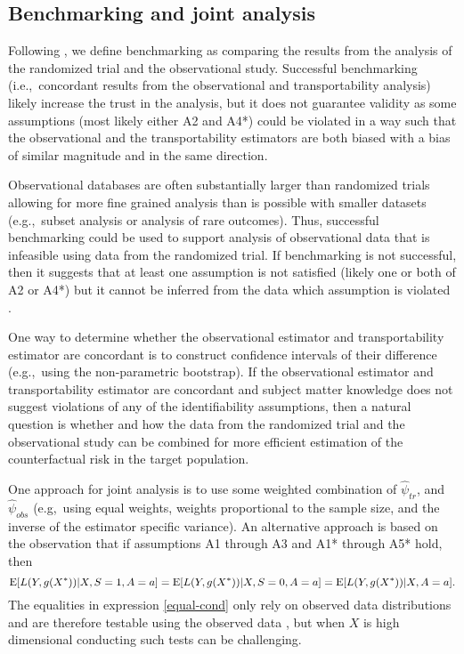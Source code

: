 \documentclass[11pt]{article}
\DeclareMathOperator{\E}{\textnormal{\mbox{E}}}
\begin{document}
\subsection*{Benchmarking and joint analysis}

Following \cite{dahabreh2020benchmarking}, we define benchmarking as comparing the results from the analysis of the randomized trial and the observational study. Successful benchmarking (i.e.,~concordant results from the observational and transportability analysis) likely increase the trust in the analysis, but it does not guarantee validity as some assumptions (most likely either A2 and A4*) could be violated in a way such that the observational and the transportability estimators are both biased with a bias of similar magnitude and in the same direction.

Observational databases are often substantially larger than randomized trials allowing for more fine grained analysis than is possible with smaller datasets (e.g.,~subset analysis or analysis of rare outcomes). Thus, successful benchmarking could be used to support analysis of observational data that is infeasible using data from the randomized trial. If benchmarking is not successful, then it suggests that at least one assumption is not satisfied (likely one or both of A2 or A4*) but it cannot be inferred from the data which assumption is violated \cite{dahabreh_benchmarking_2020}. 

One way to determine whether the observational estimator and transportability estimator are concordant is to construct confidence intervals of their difference (e.g.,~using the non-parametric bootstrap). If the observational estimator and transportability estimator are concordant and subject matter knowledge does not suggest violations of any of the identifiability assumptions, then a natural question is whether and how the data from the randomized trial and the observational study can be combined for more efficient estimation of the counterfactual risk in the target population\cite{dahabreh2020benchmarking,dahabreh2023using, hartman2015sate}. 

One approach for joint analysis is to use some weighted combination of $\widehat\psi_{tr}$, and $\widehat\psi_{obs}$ (e.g,~using equal weights, weights proportional to the sample size, and the inverse of the estimator specific variance). An alternative approach is based on the observation that if assumptions A1 through A3 and A1* through A5* hold, then 
\begin{equation}
\label{equal-cond}
\E[L(Y, g(X^*)) |X, S=1, A=a] = \E[L(Y, g(X^*)) |X, S=0, A=a] = \E[L(Y, g(X^*)) |X, A=a].
\end{equation}
The equalities in expression \eqref{equal-cond} only rely on observed data distributions and are therefore testable using the observed data \cite{racine2006testing}, but when $X$ is high dimensional conducting such tests can be challenging.
\end{document}
